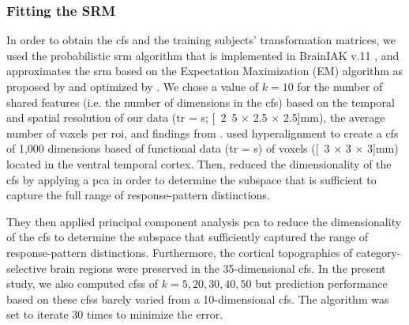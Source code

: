 \subsubsection{Fitting the SRM}
%
In order to obtain the \ac{cfs} and the training subjects' transformation
matrices, we used the probabilistic \ac{srm} algorithm that is implemented in
BrainIAK v.11 \citep[Brain Imaging Analysis Kit;][]{kumar2020brainiak,
kumar2020brainiaktutorial}, and approximates the \ac{srm} based on the
Expectation Maximization (EM) algorithm as proposed by \citet{chen2015reduced}
and optimized by \citet{anderson2016enabling}.
%
%
We chose a value of $k=10$ for the number of shared features (i.e. the number of
dimensions in the \ac{cfs}) based on the temporal and spatial resolution of our
data (\ac{tr} = \unit[2]{s}; \unit[2.5 $\times$ 2.5 $\times$ 2.5]{mm}), the
average number of voxels per \ac{roi}, and findings from
\citet{haxby2011common}.
%
\citet{haxby2011common} used hyperalignment to create a \ac{cfs} of 1,000
dimensions based of functional data (\ac{tr} = \unit[3]{s}) of voxels (\unit[3
$\times$ 3 $\times$ 3]{mm}) located in the ventral temporal cortex.
%
Then, \citet{haxby2011common} reduced the dimensionality of the \ac{cfs} by
applying a \ac{pca} in order to determine the subspace that is sufficient to
capture the full range of response-pattern distinctions.

They then applied principal component analysis \ac{pca} to reduce the
dimensionality of the \ac{cfs} to determine the subspace that sufficiently
captured the range of response-pattern distinctions.
%
Furthermore, the cortical topographies of category-selective brain regions were
preserved in the 35-dimensional \ac{cfs}.
In the present study, we also computed \acp{cfs} of $k=5, 20, 30, 40, 50$ but
prediction performance based on these \acp{cfs} barely varied from a
10-dimensional \ac{cfs}.
The algorithm was set to iterate 30 times to minimize the error.

